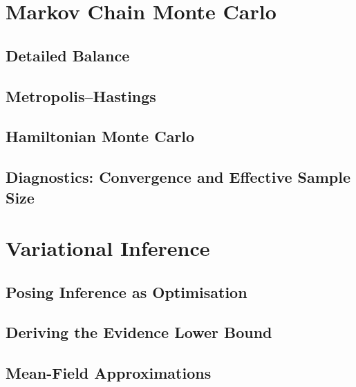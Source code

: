 
\section{Markov Chain Monte Carlo}
\label{sec:mcmc}

\subsection{Detailed Balance}

\subsection{Metropolis--Hastings}


\subsection{Hamiltonian Monte Carlo}

\subsection{Diagnostics: Convergence and Effective Sample Size}

\section{Variational Inference}
\label{sec:variational-inference}

\subsection{Posing Inference as Optimisation}

\subsection{Deriving the Evidence Lower Bound}


\subsection{Mean-Field Approximations}

